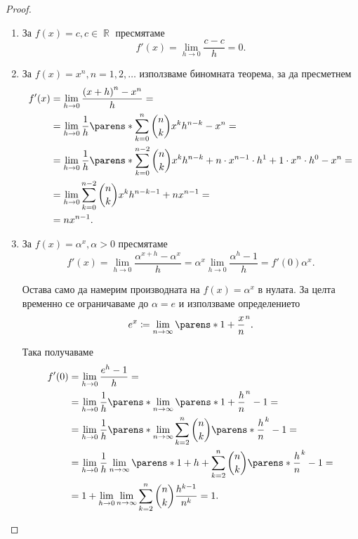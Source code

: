 \documentclass{../../common/topic}
\begin{document}
\begin{proof}
  \hfill
  \begin{enumerate}
    \item За \( f(x) = c, c \in \BbbR \) пресмятаме
    \begin{equation*}
      f'(x) = \lim_{h \to 0} \frac {c - c} h = 0.
    \end{equation*}

    \item За \( f(x) = x^n, n = 1, 2, \ldots \) използваме биномната теорема, за да пресметнем
    \begin{align*}
      f'(x)
      &=
      \lim_{h \to 0} \frac {{(x+h)}^n - x^n} h
      = \\ &=
      \lim_{h \to 0} \frac 1 h \parens*{\sum_{k=0}^n \binom{n}{k} x^k h^{n-k} - x^n }
      = \\ &=
      \lim_{h \to 0} \frac 1 h \parens*{\sum_{k=0}^{n-2} \binom{n}{k} x^k h^{n-k} + n \cdot x^{n-1} \cdot h^1 + 1 \cdot x^n \cdot h^0 - x^n }
      = \\ &=
      \lim_{h \to 0} \sum_{k=0}^{n-2} \binom{n}{k} x^k h^{n-k-1} + n x^{n-1}
      = \\ &=
      n x^{n-1}.
    \end{align*}

    \item За \( f(x) = \alpha^x, \alpha > 0 \) пресмятаме
    \begin{equation*}
      f'(x)
      =
      \lim_{h \to 0} \frac {\alpha^{x+h} - \alpha^x} h
      =
      \alpha^x \lim_{h \to 0} \frac {\alpha^h - 1} h
      =
      f'(0) \alpha^x.
    \end{equation*}

    Остава само да намерим производната на \( f(x) = \alpha^x \) в нулата. За целта временно се ограничаваме до \( \alpha = e \) и използваме определението
    \begin{equation}\label{thm:elementary_derivatives/bernoulli_exponential_definition}
      e^x \coloneqq \lim_{n \to \infty} {\parens*{ 1 + \frac x n }}^n.
    \end{equation}

    Така получаваме
    \begin{align*}
      f'(0)
      &=
      \lim_{h \to 0} \frac {e^h - 1} h
      = \\ &=
      \lim_{h \to 0} \frac 1 h \parens*{ \lim_{n \to \infty} {\parens*{ 1 + \frac h n }}^n - 1 }
      = \\ &=
      \lim_{h \to 0} \frac 1 h \parens*{ \lim_{n \to \infty} \sum_{k=2}^n \binom{n}{k} {\parens*{\frac h n }}^k - 1 }
      = \\ &=
      \lim_{h \to 0} \frac 1 h \lim_{n \to \infty} \parens*{ 1 + h + \sum_{k=2}^n \binom{n}{k} {\parens*{\frac h n }}^k - 1 }
      = \\ &=
      1 + \lim_{h \to 0} \lim_{n \to \infty} \sum_{k=2}^n \binom{n}{k} \frac {h^{k-1}} {n^k} = 1.
    \end{align*}


\end{enumerate}
\end{proof}
\end{document}

